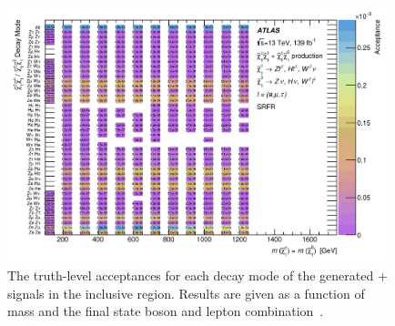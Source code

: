 \begin{figure}[tbp]
  \begin{center}
    \includegraphics[width=0.98\textwidth]{figs/rpvthreel/MC_Acc_MassvsProcess_SRTL_emutau.png}
  \end{center}
  \caption[Signal acceptance by process in \SRFR]
          {The truth-level acceptances for each decay mode of the generated \CCsignal + \CNsignal signals in the inclusive \SRFR region. Results are given as a function of \chono mass and the final state boson and lepton combination~\cite{ATLAS:2020uer}.}
          \label{fig:AccSRFR}
\end{figure}

